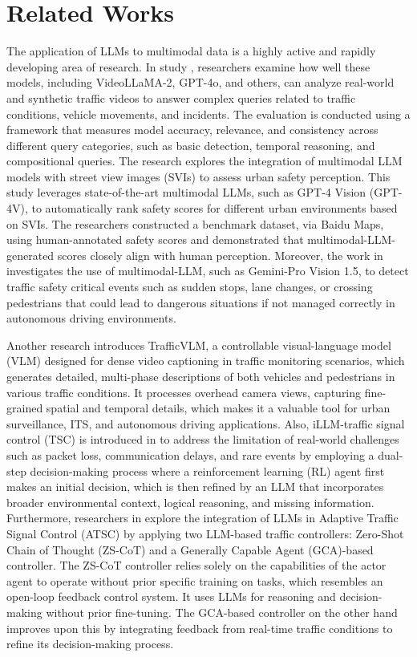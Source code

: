 \section{Related Works}
\label{sec:2}

The application of LLMs to multimodal data is a highly active and rapidly developing area of research. In study \cite{2}, researchers examine how well these models, including VideoLLaMA-2, GPT-4o, and others, can analyze real-world and synthetic traffic videos to answer complex queries related to traffic conditions, vehicle movements, and incidents. The evaluation is conducted using a framework that measures model accuracy, relevance, and consistency across different query categories, such as basic detection, temporal reasoning, and compositional queries. The research \cite{7} explores the integration of multimodal LLM models with street view images (SVIs) to assess urban safety perception. This study leverages state-of-the-art multimodal LLMs, such as GPT-4 Vision (GPT-4V), to automatically rank safety scores for different urban environments based on SVIs. The researchers constructed a benchmark dataset, via Baidu Maps, using human-annotated safety scores and demonstrated that multimodal-LLM-generated scores closely align with human perception. Moreover, the work in \cite{8} investigates the use of multimodal-LLM, such as Gemini-Pro Vision 1.5, to detect traffic safety critical events such as sudden stops, lane changes, or crossing pedestrians that could lead to dangerous situations if not managed correctly in autonomous driving environments. 

Another research \cite{11} introduces TrafficVLM, a controllable visual-language model (VLM) designed for dense video captioning in traffic monitoring scenarios, which generates detailed, multi-phase descriptions of both vehicles and pedestrians in various traffic conditions. It processes overhead camera views, capturing fine-grained spatial and temporal details, which makes it a valuable tool for urban surveillance, ITS, and autonomous driving applications. Also, iLLM-traffic signal control (TSC) is introduced in \cite{12} to address the limitation of real-world challenges such as packet loss, communication delays, and rare events by employing a dual-step decision-making process where a reinforcement learning (RL) agent first makes an initial decision, which is then refined by an LLM that incorporates broader environmental context, logical reasoning, and missing information. Furthermore, researchers in \cite{13} explore the integration of LLMs in Adaptive Traffic Signal Control (ATSC) by applying two LLM-based traffic controllers: Zero-Shot Chain of Thought (ZS-CoT) and a Generally Capable Agent (GCA)-based controller. The ZS-CoT controller relies solely on the capabilities of the actor agent to operate without prior specific training on tasks, which resembles an open-loop feedback control system. It uses LLMs for reasoning and decision-making without prior fine-tuning. The GCA-based controller on the other hand improves upon this by integrating feedback from real-time traffic conditions to refine its decision-making process. 



